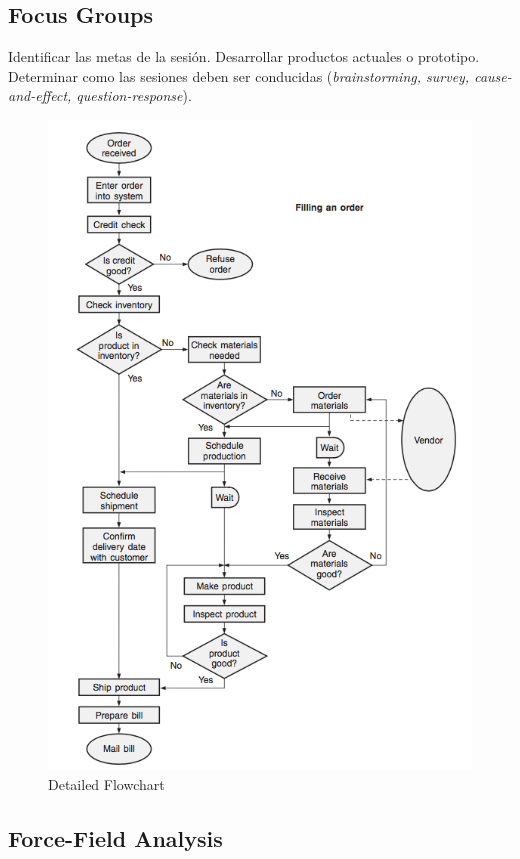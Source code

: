 \documentclass[]{article}
\begin{document}
\subsection{Focus Groups}

Identificar las metas de la sesión. Desarrollar productos actuales o prototipo. Determinar como las sesiones deben ser conducidas (\textit{brainstorming, survey, cause-and-effect, question-response}).

\begin{figure}[ht!]
	\centering
	\includegraphics[width=120mm]{imagenes/DetailedFlowchart.png}
	\caption{Detailed Flowchart}
	\label{fig:DetailedFlowchart}
\end{figure}

\subsection{Force-Field Analysis}
\end{document}
